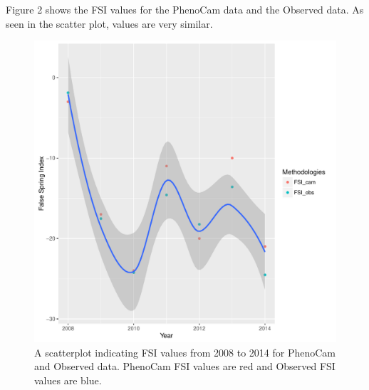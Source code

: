 \documentclass{article}\usepackage[]{graphicx}\usepackage[]{color}
\makeatletter
\def\maxwidth{ %
  \ifdim\Gin@nat@width>\linewidth
    \linewidth
  \else
    \Gin@nat@width
  \fi
}
\makeatother
\begin{document}
Figure 2 shows the FSI values for the PhenoCam data and the Observed data. As seen in the scatter plot, values are very similar.

\begin{figure}[H]

{\centering \includegraphics[width=\maxwidth]{figure/hf-1} 

}

\caption[A scatterplot indicating FSI values from 2008 to 2014 for PhenoCam and Observed data]{A scatterplot indicating FSI values from 2008 to 2014 for PhenoCam and Observed data. PhenoCam FSI values are red and Observed FSI values are blue.}\label{fig:hf}
\end{figure}
\end{document}
